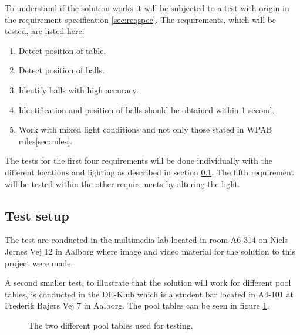 To understand if the solution works it will be subjected to a test with origin in the requirement specification \ref{sec:reqspec}. The requirements, which will be tested, are listed here:

\begin{enumerate}
\setlength{\itemsep}{0mm}
	\item Detect position of table.
	\item Detect position of balls.
	\item Identify balls with high accuracy.
	\item Identification and position of balls should be obtained within 1 second.
	\item Work with mixed light conditions and not only those stated in WPAB rules\ref{sec:rules}.
\end{enumerate}

The tests for the first four requirements will be done individually with the different locations and lighting as described in section \ref{sec:testsetup}. The fifth requirement will be tested within the other requirements by altering the light.

\subsection{Test setup}
\label{sec:testsetup}
The test are conducted in the multimedia lab located in room A6-314 on Niels Jernes Vej 12 in Aalborg where image and video material for the solution to this project were made. 

A second smaller test, to illustrate that the solution will work for different pool tables, is conducted in the DE-Klub which is a student bar located in A4-101 at Frederik Bajers Vej 7 in Aalborg. The pool tables can be seen in figure \ref{fig:diffpool}.\\

\begin{figure}[H]
  \centering
  \quad           
   \caption{The two different pool tables used for testing.}
  \label{fig:diffpool}
\end{figure}


